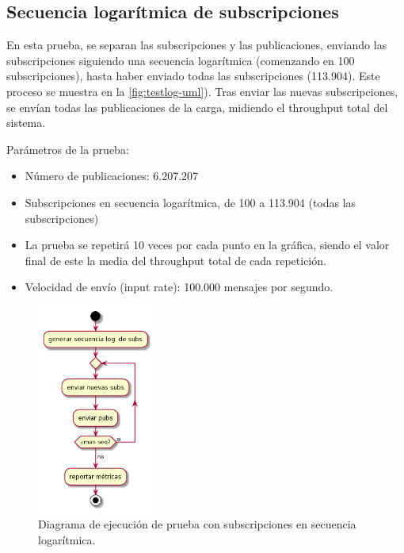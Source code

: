 
\subsection{Secuencia logarítmica de subscripciones} \label{ssct:desarrollo_pruebas-esilbops_test-log}

En esta prueba, se separan las subscripciones y las publicaciones, enviando las subscripciones
siguiendo una secuencia logarítmica (comenzando en 100 subscripciones), hasta haber enviado todas
las subscripciones (113.904). Este proceso se muestra en la \autoref{fig:testlog-uml}). 
Tras enviar las nuevas subscripciones, se envían todas las publicaciones de la carga, midiendo el
throughput total del sistema.

Parámetros de la prueba:
\begin{itemize}
    \item Número de publicaciones: 6.207.207
    \item Subscripciones en secuencia logarítmica, de 100 a 113.904 (todas las subscripciones)
    \item La prueba se repetirá 10 veces por cada punto en la gráfica, siendo el valor final
    de este la media del throughput total de cada repetición.
    \item Velocidad de envío (input rate): 100.000 mensajes por segundo.
\end{itemize}

\begin{figure}[htpb]
    \centering
    \includegraphics[width=0.35\textwidth]{images/plantuml/testlog-plantuml.png}
    \caption{Diagrama de ejecución de prueba con subscripciones en secuencia logarítmica.}
    \label{fig:testlog-uml}
\end{figure}


